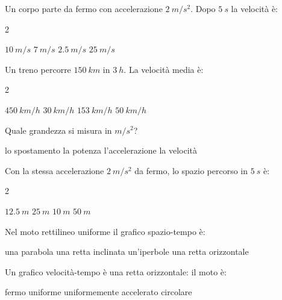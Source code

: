 \documentclass[a4paper,10pt]{exam}
\begin{document}
\vspace{2mm}
\begin{questions}
\question Un corpo parte da fermo con accelerazione $\SI{2}{m/s^2}$. Dopo $\SI{5}{s}$ la velocità è:
\vspace{0.2em}
\begin{multicols}{2}
\begin{choices}
\choice $\SI{10}{m/s}$
\choice $\SI{7}{m/s}$
\choice $\SI{2.5}{m/s}$
\choice $\SI{25}{m/s}$
\end{choices}
\end{multicols}

\question Un treno percorre $\SI{150}{km}$ in $\SI{3}{h}$. La velocità media è:
\vspace{0.2em}
\begin{multicols}{2}
\begin{choices}
\choice $\SI{450}{km/h}$
\choice $\SI{30}{km/h}$
\choice $\SI{153}{km/h}$
\choice $\SI{50}{km/h}$
\end{choices}
\end{multicols}

\question Quale grandezza si misura in $\si{m/s^2}$?
\vspace{0.2em}
\begin{choices}
\choice lo spostamento
\choice la potenza
\choice l'accelerazione
\choice la velocità
\end{choices}

\question Con la stessa accelerazione $\SI{2}{m/s^2}$ da fermo, lo spazio percorso in $\SI{5}{s}$ è:
\vspace{0.2em}
\begin{multicols}{2}
\begin{choices}
\choice $\SI{12.5}{m}$
\choice $\SI{25}{m}$
\choice $\SI{10}{m}$
\choice $\SI{50}{m}$
\end{choices}
\end{multicols}

\question Nel moto rettilineo uniforme il grafico spazio-tempo è:
\vspace{0.2em}
\begin{choices}
\choice una parabola
\choice una retta inclinata
\choice un'iperbole
\choice una retta orizzontale
\end{choices}

\question Un grafico velocità-tempo è una retta orizzontale: il moto è:
\vspace{0.2em}
\begin{choices}
\choice fermo
\choice uniforme
\choice uniformemente accelerato
\choice circolare
\end{choices}

\end{questions}
\end{document}

